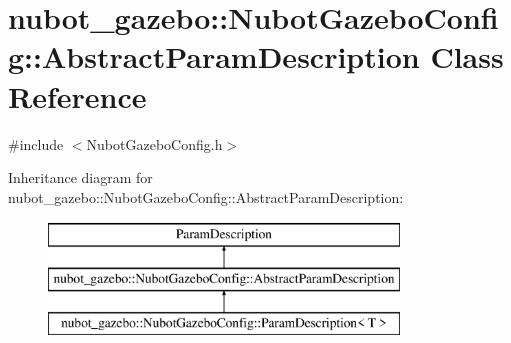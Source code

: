 \hypertarget{classnubot__gazebo_1_1NubotGazeboConfig_1_1AbstractParamDescription}{\section{nubot\-\_\-gazebo\-:\-:Nubot\-Gazebo\-Config\-:\-:Abstract\-Param\-Description Class Reference}
\label{classnubot__gazebo_1_1NubotGazeboConfig_1_1AbstractParamDescription}
}


{\ttfamily \#include $<$Nubot\-Gazebo\-Config.\-h$>$}

Inheritance diagram for nubot\-\_\-gazebo\-:\-:Nubot\-Gazebo\-Config\-:\-:Abstract\-Param\-Description\-:\begin{figure}[H]
\begin{center}
\leavevmode
\includegraphics[height=3.000000cm]{classnubot__gazebo_1_1NubotGazeboConfig_1_1AbstractParamDescription}
\end{center}
\end{figure}
